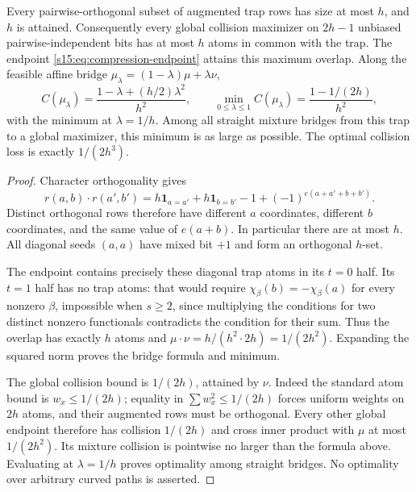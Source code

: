 \begin{theorem}
\label{s15:thm:compression-optimal-overlap}
Every pairwise-orthogonal subset of augmented trap rows has size at most
$h$, and $h$ is attained. Consequently every global collision maximizer
on $2h-1$ unbiased pairwise-independent bits has at most $h$ atoms in
common with the trap. The endpoint \eqref{s15:eq:compression-endpoint}
attains this maximum overlap. Along the feasible affine bridge
$\mu_\lambda=(1-\lambda)\mu+\lambda\nu$,
\[
 C(\mu_\lambda)=\frac{1-\lambda+(h/2)\lambda^2}{h^2},\qquad
 \min_{0\le\lambda\le1}C(\mu_\lambda)
 =\frac{1-1/(2h)}{h^2},
\]
with the minimum at $\lambda=1/h$.
Among all straight mixture bridges from this trap to a global maximizer,
this minimum is as large as possible. The optimal collision loss is
exactly $1/(2h^3)$.
\end{theorem}
\begin{proof}
Character orthogonality gives
\[
 r(a,b)\cdot r(a',b')=
 h\mathbf1_{a=a'}+h\mathbf1_{b=b'}-1+
 (-1)^{e(a+a'+b+b')}.
\]
Distinct orthogonal rows therefore have different $a$ coordinates,
different $b$ coordinates, and the same value of $e(a+b)$.
In particular there are at most $h$. All diagonal seeds $(a,a)$ have
mixed bit $+1$ and form an orthogonal $h$-set.

The endpoint contains precisely these diagonal trap atoms in its $t=0$
half. Its $t=1$ half has no trap atoms: that would require
$\chi_\beta(b)=-\chi_\beta(a)$ for every nonzero $\beta$, impossible
when $s\ge2$, since multiplying the conditions for two distinct nonzero
functionals contradicts the condition for their sum. Thus the overlap
has exactly $h$ atoms and
$\mu\cdot\nu=h/(h^2\cdot2h)=1/(2h^2)$.
Expanding the squared norm proves the bridge formula and minimum.

The global collision bound is $1/(2h)$, attained by $\nu$. Indeed the
standard atom bound is $w_x\le1/(2h)$; equality in
$\sum w_x^2\le1/(2h)$ forces uniform weights on $2h$ atoms, and their
augmented rows must be orthogonal. Every other global endpoint therefore
has collision $1/(2h)$ and cross inner product with $\mu$ at most
$1/(2h^2)$. Its mixture collision is pointwise no larger than the
formula above. Evaluating at $\lambda=1/h$ proves optimality among
straight bridges. No optimality over arbitrary curved paths is asserted.
\end{proof}

